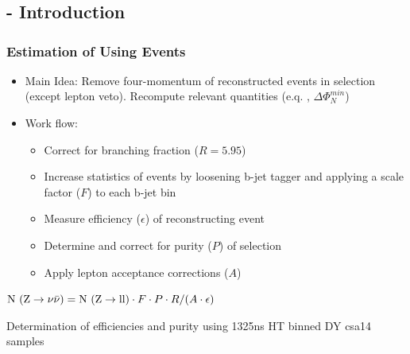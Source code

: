 \documentclass{beamer}
\begin{document}
\section{\ZInvJets}
\begin{frame}
  \begin{center}
    \huge\ZInvJets
    
  \end{center}
\end{frame}


\subsection{\Zll - Introduction}
\begin{frame}
\frametitle{Estimation of \ZInvJets  Using \Zll Events}
\begin{itemize}
 \item Main Idea: Remove four-momentum of reconstructed \Zll events in selection (except lepton veto). Recompute relevant quantities (e.q. \met, $\Delta\Phi_{N}^{min}$)
 \item Work flow:
 \begin{itemize}
  \item Correct for branching fraction ($R = 5.95$)
  \item Increase statistics of \Zll events by loosening b-jet tagger and applying a scale factor ($F$) to each b-jet bin
  \item Measure efficiency ($\epsilon$) of reconstructing \Zll event
  \item Determine and correct for purity ($P$) of \Zll selection
  \item Apply lepton acceptance corrections ($A$)
 \end{itemize}
\end{itemize}
  \begin{centering}
  $\text{N }(\text{Z}\rightarrow\nu\bar{\nu}) = \text{N }(\text{Z}\rightarrow\text{ll})\cdot F \cdot P \cdot R / (A\cdot \epsilon)$
  \end{centering}
  \begin{block}{}
\centering
Determination of \Zll efficiencies and purity using 13\tev 25ns HT binned DY csa14 samples
\end{block}
\end{frame}

\end{document}
